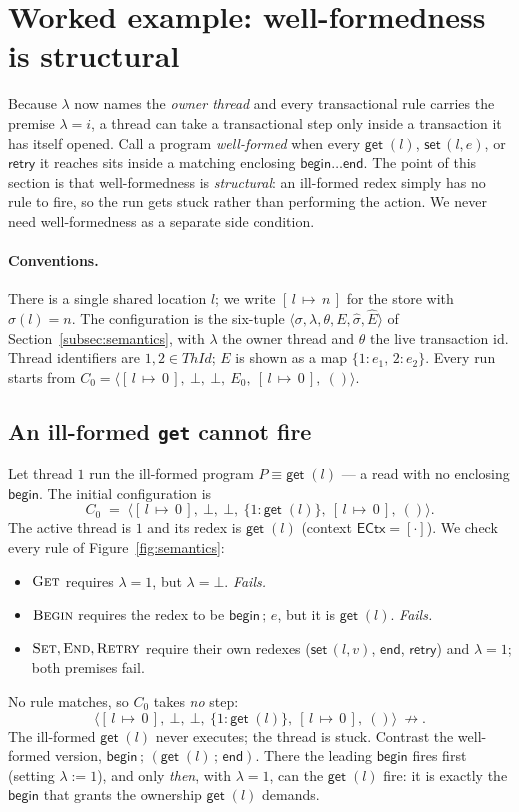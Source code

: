 \documentclass[manuscript,nonacm]{acmart}
\theoremstyle{acmdefinition}
\newcommand{\ThId}{\mathit{ThId}}   %
\newcommand{\unit}{()}
\newcommand{\bbegin}{\textsf{begin}}
\newcommand{\eend}{\textsf{end}}
\newcommand{\retry}{\textsf{retry}}
\newcommand{\getc}[1]{\textsf{get}\;(#1)}
\newcommand{\setc}[2]{\textsf{set}\,(#1,#2)}
\newcommand{\ectx}{\mathsf{ECtx}}
\newcommand{\st}[1]{[\,l\,{\mapsto}\,#1\,]}          %
\newcommand{\emap}[1]{\{#1\}}                          %
\begin{document}
\section{Worked example: well-formedness is structural}
\label{sec:examples}

Because $\lambda$ now names the \emph{owner thread} and every transactional rule
carries the premise $\lambda = i$, a thread can take a transactional step only
inside a transaction it has itself opened. Call a program \emph{well-formed} when
every $\getc{l}$, $\setc{l}{e}$, or $\retry$ it reaches sits inside a
matching enclosing $\bbegin\dots\eend$. The point of this section is that
well-formedness is \emph{structural}: an ill-formed redex simply has no rule to
fire, so the run gets stuck rather than performing the action. We never need
well-formedness as a separate side condition.

\paragraph{Conventions.}
There is a single shared location $l$; we write $\st{n}$ for the store with
$\sigma(l)=n$. The configuration is the six-tuple
$\langle\sigma,\lambda,\theta,E,\hat{\sigma},\hat{E}\rangle$ of
Section~\ref{subsec:semantics}, with $\lambda$ the owner thread and $\theta$ the live
transaction id. Thread identifiers are $1,2\in\ThId$; $E$ is shown as a map
$\emap{1{:}e_1,\,2{:}e_2}$. Every run starts from
$C_0=\langle \st{0},\ \bot,\ \bot,\ E_0,\ \st{0},\ \unit\rangle$.

\subsection{An ill-formed \texttt{get} cannot fire}

Let thread $1$ run the ill-formed program $P \equiv \getc{l}$ --- a read with no
enclosing $\bbegin$. The initial configuration is
\[
C_0 \;=\; \langle \st{0},\ \bot,\ \bot,\ \emap{1{:}\getc{l}},\ \st{0},\ \unit\rangle .
\]
The active thread is $1$ and its redex is $\getc{l}$ (context $\ectx=[\cdot]$).
We check every rule of Figure~\ref{fig:semantics}:
\begin{itemize}
\item $\textsc{Get}$ requires $\lambda = 1$, but $\lambda = \bot$. \emph{Fails.}
\item $\textsc{Begin}$ requires the redex to be $\bbegin\,;\,e$, but it is
$\getc{l}$. \emph{Fails.}
\item $\textsc{Set},\textsc{End},\textsc{Retry}$ require their own redexes
($\setc{l}{v}$, $\eend$, $\retry$) and $\lambda = 1$; both premises fail.
\end{itemize}
No rule matches, so $C_0$ takes \emph{no} step:
\[
\langle \st{0},\ \bot,\ \bot,\ \emap{1{:}\getc{l}},\ \st{0},\ \unit\rangle
\ \not\rightarrow .
\]
The ill-formed $\getc{l}$ never executes; the thread is stuck. Contrast the
well-formed version, $\bbegin\,;\,(\getc{l}\,;\,\eend)$. There the leading
$\bbegin$ fires first (setting $\lambda:=1$), and only \emph{then}, with
$\lambda = 1$, can the $\getc{l}$ fire: it is exactly the $\bbegin$ that grants
the ownership $\getc{l}$ demands.
\end{document}
